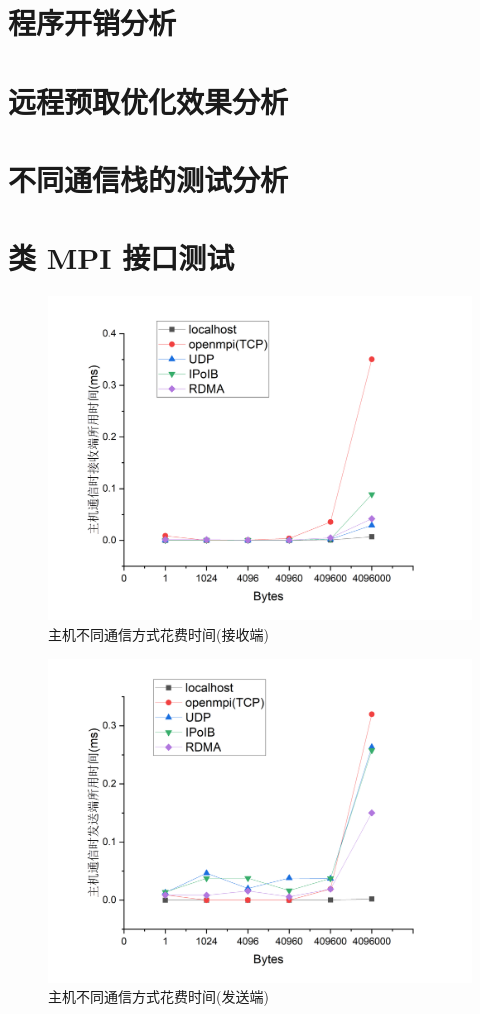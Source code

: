 {    \section{程序开销分析}

    \section{远程预取优化效果分析}

    \section{不同通信栈的测试分析}

    \section{类 MPI 接口测试}
    \begin{figure}[H]
        \centering
        \includegraphics[width=1.0\textwidth]{Img/recv_perf.png}
        \caption{主机不同通信方式花费时间(接收端)}
    \end{figure}

    \begin{figure}[H]
        \centering
        \includegraphics[width=1.0\textwidth]{Img/send_perf.png}
        \caption{主机不同通信方式花费时间(发送端)}
    \end{figure}

}
